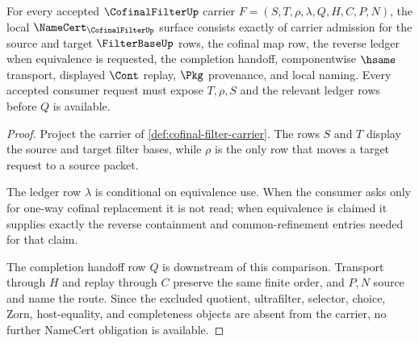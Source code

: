 \begin{theorem}
\label{thm:cofinal-filter-namecert-obligations}
For every accepted $\CofinalFilterUp$ carrier $F=(S,T,\rho,\lambda,Q,H,C,P,N)$, the local $\NameCert_{\CofinalFilterUp}$ surface consists exactly of carrier admission for the source and target $\FilterBaseUp$ rows, the cofinal map row, the reverse ledger when equivalence is requested, the completion handoff, componentwise $\hsame$ transport, displayed $\Cont$ replay, $\Pkg$ provenance, and local naming. Every accepted consumer request must expose $T,\rho,S$ and the relevant ledger rows before $Q$ is available.
\end{theorem}
\begin{proof}
Project the carrier of \autoref{def:cofinal-filter-carrier}. The rows $S$ and $T$ display the source and target filter bases, while $\rho$ is the only row that moves a target request to a source packet.

The ledger row $\lambda$ is conditional on equivalence use. When the consumer asks only for one-way cofinal replacement it is not read; when equivalence is claimed it supplies exactly the reverse containment and common-refinement entries needed for that claim.

The completion handoff row $Q$ is downstream of this comparison. Transport through $H$ and replay through $C$ preserve the same finite order, and $P,N$ source and name the route. Since the excluded quotient, ultrafilter, selector, choice, Zorn, host-equality, and completeness objects are absent from the carrier, no further NameCert obligation is available.
\end{proof}

